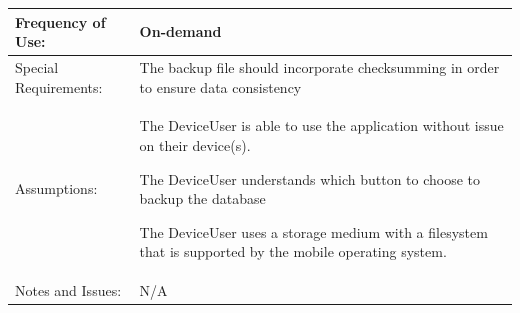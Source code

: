 \documentclass[stu]{apa7}
\newcommand{\nextitem}{\par\hspace*{\labelsep}\textbullet\hspace*{\labelsep}}
\begin{document}
{\begin{xltabular}{\textwidth}{|l|X|}
  Frequency of Use: & On-demand \\ \hline

  Special Requirements: & \nextitem The backup file should incorporate checksumming in order to ensure data consistency \\ \hline

  Assumptions: & \nextitem The DeviceUser is able to use the application without issue on their device(s). \nextitem The DeviceUser understands which button to choose to backup the database \nextitem The DeviceUser uses a storage medium with a filesystem that is supported by the mobile operating system. \\ \hline

  Notes and Issues: & N/A \\ \hline

\end{xltabular}}
\end{document}
